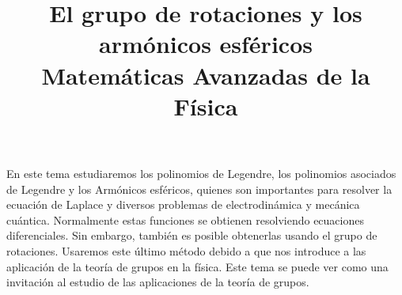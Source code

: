 
\author{}
\title{El grupo de rotaciones y los armónicos esféricos \\ {\large Matemáticas Avanzadas de la Física}\vspace{-1.5\baselineskip}}
\date{ }

\maketitle
\fontsize{14}{14}\selectfont
En este tema estudiaremos los polinomios de Legendre, los polinomios asociados de Legendre y los Armónicos esféricos, quienes son importantes para resolver la ecuación de Laplace y diversos problemas de electrodinámica y mecánica cuántica. Normalmente estas funciones se obtienen resolviendo ecuaciones diferenciales. Sin embargo, también es posible obtenerlas usando el grupo de rotaciones. Usaremos este último método debido a que nos introduce a las aplicación de la teoría de grupos en la física. Este tema se puede ver como una invitación al estudio de las aplicaciones de la teoría de grupos.
